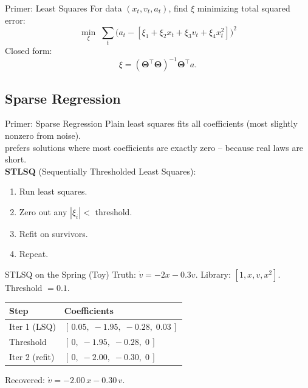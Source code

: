 \documentclass[
11pt,notheorems,hyperref={pdfauthor=Aniruddha Pandey}
]{beamer}
\begin{document}
\begin{frame}{Primer: Least Squares}
For data $(x_t, v_t, a_t)$, find $\xi$ minimizing total squared error:
\begin{equation*}
    \min_{\xi}\; \sum_t \bigl(a_t - [\xi_1 + \xi_2 x_t + \xi_3 v_t + \xi_4 x_t^2]\bigr)^2
\end{equation*}
Closed form:
\begin{equation*}
    \xi = (\boldsymbol{\Theta}^\top \boldsymbol{\Theta})^{-1} \boldsymbol{\Theta}^\top a.
\end{equation*}
\end{frame}

\subsection{Sparse Regression}

\begin{frame}{Primer: Sparse Regression}
Plain least squares fits \alert{all} coefficients (most slightly nonzero from noise).\\[0.3cm]
 prefers solutions where most coefficients are exactly zero -- because real laws are short.\\[0.3cm]
\textbf{STLSQ} (Sequentially Thresholded Least Squares):
\begin{enumerate}
    \item Run least squares.
    \item Zero out any $|\xi_i| < $ threshold.
    \item Refit on survivors.
    \item Repeat.
\end{enumerate}
\end{frame}

\begin{frame}{STLSQ on the Spring (Toy)}
Truth: $\dot{v} = -2x - 0.3v$. Library: $[1, x, v, x^2]$. Threshold $=0.1$.
\begin{table}
    \centering
    \begin{tabular}{@{}ll@{}}
        \toprule
        Step & Coefficients \\
        \midrule
        Iter 1 (LSQ)   & $[\,0.05,\;-1.95,\;-0.28,\;0.03\,]$ \\
        Threshold      & $[\,0,\;-1.95,\;-0.28,\;0\,]$ \\
        Iter 2 (refit) & $[\,0,\;-2.00,\;-0.30,\;0\,]$ \\
        \bottomrule
    \end{tabular}
\end{table}
Recovered: $\dot{v} = -2.00\,x - 0.30\,v$. 
\end{frame}
\end{document}
